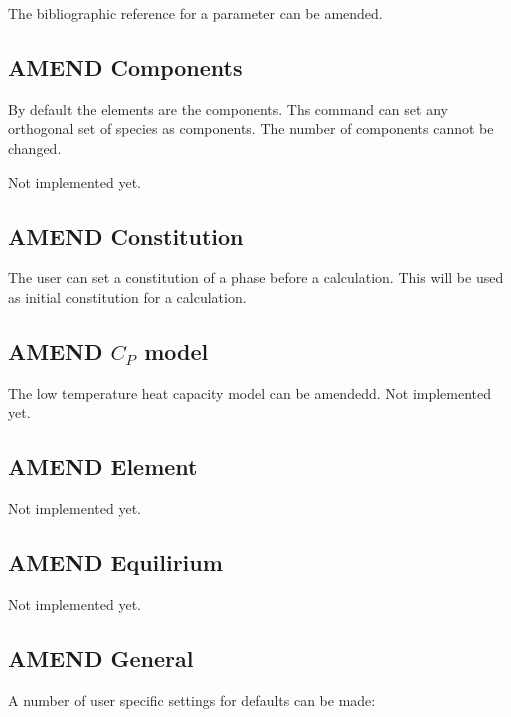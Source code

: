 \documentclass[12pt]{article}
\begin{document}
The bibliographic reference for a parameter can be amended.

\subsection{AMEND Components}

By default the elements are the components.  Ths command can set any
orthogonal set of species as components.  The number of components
cannot be changed.

Not implemented yet.

\subsection{AMEND Constitution}

The user can set a constitution of a phase before a calculation.  This
will be used as initial constitution for a calculation.

\subsection{AMEND $C_P$ model}

The low temperature heat capacity model can be amendedd.  Not
implemented yet.

\subsection{AMEND Element}

Not implemented yet.

\subsection{AMEND Equilirium}

Not implemented yet.

\subsection{AMEND General}

A number of user specific settings for defaults can be made:
\end{document}
